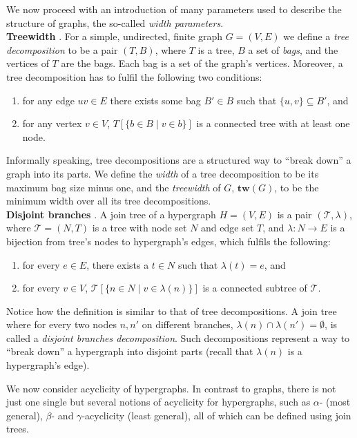 We now proceed with an introduction of many parameters used to describe the structure of graphs, the so-called {\em width parameters}. \\

\noindent
\textbf{Treewidth} \cite{DBLP:conf/sat/GanianS17}.
For a simple, undirected, finite graph $G = (V,E)$ we define a {\em tree decomposition} to be a pair $(T, B)$, where $T$ is a tree, $B$ a set of {\em bags}, and the vertices of $T$ are the bags.
Each bag is a set of the graph's vertices.
Moreover, a tree decomposition has to fulfil the following two conditions:
\begin{enumerate}
	\item for any edge $uv\in E$ there exists some bag $B' \in B$ such that $\{u,v\} \subseteq B'$, and
	\item for any vertex $v\in V$, $T[\{ b \in B \; | \; v \in b \}]$ is a connected tree with at least one node.
\end{enumerate}
Informally speaking, tree decompositions are a structured way to ``break down'' a graph into its parts.
We define the {\em width} of a tree decomposition to be its maximum bag size minus one, and the {\em treewidth} of $G$, $\textbf{tw}(G)$, to be the minimum width over all its tree decompositions.\\

\noindent 
\textbf{Disjoint branches} \cite{DBLP:conf/sat/CapelliDM14}.
A join tree of a hypergraph $H=(V,E)$ is a pair $(\mathcal{T}, \lambda)$, where $\mathcal{T}=(N,T)$ is a tree with node set $N$ and edge set $T$, and $\lambda : N \rightarrow E$ is a bijection from tree's nodes to hypergraph's edges, which fulfils the following:
\begin{enumerate}
	\item for every $e\in E$, there exists a $t\in N$ such that $\lambda(t)=e$, and
	\item for every $v\in V$, $\mathcal{T}[\{ n \in N \; | \; v \in \lambda(n) \}]$ is a connected subtree of $\mathcal{T}$.
\end{enumerate}
Notice how the definition is similar to that of tree decompositions.
A join tree where for every two nodes $n, n'$ on different branches, $\lambda(n) \cap \lambda(n') = \emptyset$, is called a {\em disjoint branches decomposition}. 
Such decompositions represent a way to ``break down'' a hypergraph into disjoint parts (recall that $\lambda(n)$ is a hypergraph's edge).

We now consider acyclicity of hypergraphs.
In contrast to graphs, there is not just one single but several notions of acyclicity for hypergraphs, such as $\alpha$- (most general), $\beta$- and $\gamma$-acyclicity (least general), all of which can be defined using join trees.

